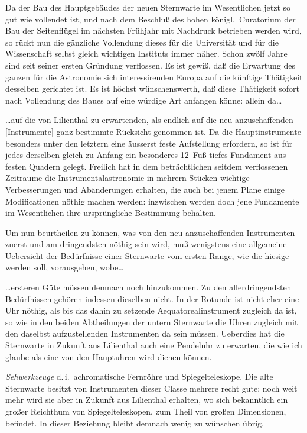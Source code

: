 \documentclass[12pt,a4paper]{article}
\theoremstyle{plain}
\theoremstyle{definition}
\theoremstyle{remark}
\begin{document}
Da der Bau des Hauptgebäudes der neuen Sternwarte im Wesentlichen jetzt so gut wie vollendet ist, und nach dem Beschluß des hohen königl.\ Curatorium der Bau der Seitenflügel im nächsten Frühjahr mit Nachdruck betrieben werden wird, so rückt nun die gänzliche Vollendung dieses für die Universität und für die Wissenschaft selbst gleich wichtigen Instituts immer näher. Schon zwölf Jahre sind seit seiner ersten Gründung verflossen. Es ist gewiß, daß die Erwartung des ganzen für die Astronomie sich interessirenden Europa auf die künftige Thätigkeit desselben gerichtet ist. Es ist höchst wünschenswerth, daß diese Thätigkeit sofort nach Vollendung des Baues auf eine würdige Art anfangen könne: allein da\ldots

\ldots auf die von Lilienthal zu erwartenden, als endlich auf die neu anzuschaffenden [Instrumente] ganz bestimmte Rücksicht genommen ist. Da die Hauptinstrumente besonders unter den letztern eine äusserst feste Aufstellung erfordern, so ist für jedes derselben gleich zu Anfang ein besonderes 12~Fuß tiefes Fundament aus festen Quadern gelegt. Freilich hat in dem beträchtlichen seitdem verflossenen Zeitraume die Instrumentalastronomie in mehrern Stücken wichtige Verbesserungen und Abänderungen erhalten, die auch bei jenem Plane einige Modificationen nöthig machen werden: inzwischen werden doch jene Fundamente im Wesentlichen ihre ursprüngliche Bestimmung behalten.

Um nun beurtheilen zu können, was von den neu anzuschaffenden Instrumenten zuerst und am dringendsten nöthig sein wird, muß wenigstens eine allgemeine Uebersicht der Bedürfnisse einer Sternwarte vom ersten Range, wie die hiesige werden soll, vorausgehen, wobe\ldots

\ldots ersteren Güte müssen demnach noch hinzukommen. Zu den allerdringendsten Bedürfnissen gehören indessen dieselben nicht. In der Rotunde ist nicht eher eine Uhr nöthig, als bis das dahin zu setzende Aequatorealinstrument zugleich da ist, so wie in den beiden Abtheilungen der untern Sternwarte die Uhren zugleich mit den daselbst aufzustellenden Instrumenten da sein müssen. Ueberdies hat die Sternwarte in Zukunft aus Lilienthal auch eine Pendeluhr zu erwarten, die wie ich glaube als eine von den Hauptuhren wird dienen können.

\textit{Sehwerkzeuge} d.\,i.\ achromatische Fernröhre und Spiegelteleskope. Die alte Sternwarte besitzt von Instrumenten dieser Classe mehrere recht gute; noch weit mehr wird sie aber in Zukunft aus Lilienthal erhalten, wo sich bekanntlich ein großer Reichthum von Spiegelteleskopen, zum Theil von großen Dimensionen, befindet. In dieser Beziehung bleibt demnach wenig zu wünschen übrig.
\end{document}
